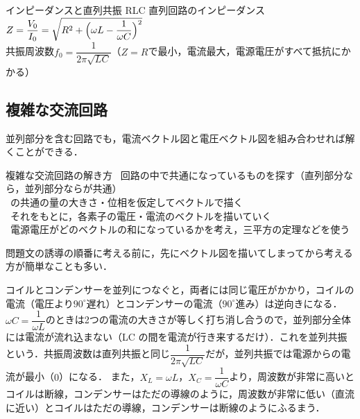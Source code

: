 \bsNeed{30mm}
\begin{matome}{インピーダンスと直列共振}
 \hspace{3mm} RLC 直列回路のインピーダンス\quad $Z=\dfrac{V_0}{I_0}=\sqrt{R^2+\Bigl(\omega L-\dfrac{1}{\omega C}\Bigr)^2}$\\
 \hspace{3mm} 共振周波数\quad $f_0=\dfrac{1}{2\pi\sqrt{LC}}$\quad（$Z=R$で最小，電流最大，電源電圧がすべて抵抗にかかる）
\end{matome}

\bsNeed{70mm}
\subsection{複雑な交流回路}

並列部分を含む回路でも，電流ベクトル図と電圧ベクトル図を組み合わせれば解くことができる．

\bsNeed{44mm}
\begin{matome}{複雑な交流回路の解き方}
 \ 回路の中で共通になっているものを探す（直列部分なら，並列部分ならが共通）\\
 \ の共通の量の大きさ・位相を仮定してベクトルで描く\\
 \ それをもとに，各素子の電圧・電流のベクトルを描いていく\\
 \ 電源電圧がどのベクトルの和になっているかを考え，三平方の定理などを使う
\end{matome}
問題文の誘導の順番に考える前に，先にベクトル図を描いてしまってから考える方が簡単なことも多い．

コイルとコンデンサーを{\gtfamily 並列}につなぐと，両者には同じ電圧がかかり，コイルの電流（電圧より$90^\circ$遅れ）とコンデンサーの電流（$90^\circ$進み）は逆向きになる．
$\omega C=\dfrac{1}{\omega L}$のときは2つの電流の大きさが等しく打ち消し合うので，並列部分全体には電流が流れ込まない（LC の間を電流が行き来するだけ）．これを{\gtfamily 並列共振}という．共振周波数は直列共振と同じ$\dfrac{1}{2\pi\sqrt{LC}}$だが，並列共振では電源からの電流が最小（$0$）になる．
また，$X_L=\omega L$，$X_C=\dfrac{1}{\omega C}$より，{\gtfamily 周波数が非常に高いとコイルは断線，コンデンサーはただの導線}のように，{\gtfamily 周波数が非常に低い（直流に近い）とコイルはただの導線，コンデンサーは断線}のようにふるまう．

